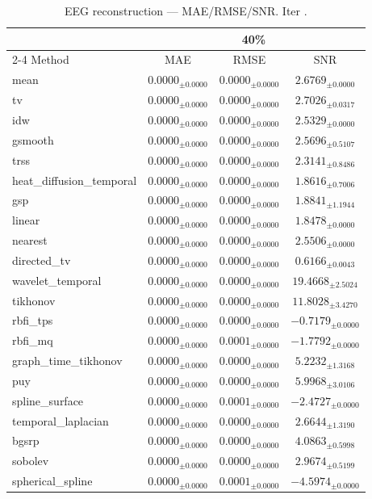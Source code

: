﻿%
\begin{table}[ht]
\centering
\caption[EEG reconstruction - Iteration it11]{EEG reconstruction — MAE/RMSE/SNR. Iter .}
\label{tab:main_it11_physionet_high_missing}
\small
\begin{tabular}{lccc}
\toprule
\multicolumn{1}{c}{} & \multicolumn{3}{c}{40\%} \\
\cmidrule(lr){2-4}
Method & MAE & RMSE & SNR \\
\midrule
mean & $0.0000_{\pm 0.0000}$ & $0.0000_{\pm 0.0000}$ & $2.6769_{\pm 0.0000}$ \\
tv & $0.0000_{\pm 0.0000}$ & $0.0000_{\pm 0.0000}$ & $2.7026_{\pm 0.0317}$ \\
idw & $0.0000_{\pm 0.0000}$ & $0.0000_{\pm 0.0000}$ & $2.5329_{\pm 0.0000}$ \\
gsmooth & $0.0000_{\pm 0.0000}$ & $0.0000_{\pm 0.0000}$ & $2.5696_{\pm 0.5107}$ \\
trss & $0.0000_{\pm 0.0000}$ & $0.0000_{\pm 0.0000}$ & $2.3141_{\pm 0.8486}$ \\
heat\_diffusion\_temporal & $0.0000_{\pm 0.0000}$ & $0.0000_{\pm 0.0000}$ & $1.8616_{\pm 0.7006}$ \\
gsp & $0.0000_{\pm 0.0000}$ & $0.0000_{\pm 0.0000}$ & $1.8841_{\pm 1.1944}$ \\
linear & $0.0000_{\pm 0.0000}$ & $0.0000_{\pm 0.0000}$ & $1.8478_{\pm 0.0000}$ \\
nearest & $0.0000_{\pm 0.0000}$ & $0.0000_{\pm 0.0000}$ & $2.5506_{\pm 0.0000}$ \\
directed\_tv & $0.0000_{\pm 0.0000}$ & $0.0000_{\pm 0.0000}$ & $0.6166_{\pm 0.0043}$ \\
wavelet\_temporal & $0.0000_{\pm 0.0000}$ & $0.0000_{\pm 0.0000}$ & $19.4668_{\pm 2.5024}$ \\
tikhonov & $0.0000_{\pm 0.0000}$ & $0.0000_{\pm 0.0000}$ & $11.8028_{\pm 3.4270}$ \\
rbfi\_tps & $0.0000_{\pm 0.0000}$ & $0.0000_{\pm 0.0000}$ & $-0.7179_{\pm 0.0000}$ \\
rbfi\_mq & $0.0000_{\pm 0.0000}$ & $0.0001_{\pm 0.0000}$ & $-1.7792_{\pm 0.0000}$ \\
graph\_time\_tikhonov & $0.0000_{\pm 0.0000}$ & $0.0000_{\pm 0.0000}$ & $5.2232_{\pm 1.3168}$ \\
puy & $0.0000_{\pm 0.0000}$ & $0.0000_{\pm 0.0000}$ & $5.9968_{\pm 3.0106}$ \\
spline\_surface & $0.0000_{\pm 0.0000}$ & $0.0001_{\pm 0.0000}$ & $-2.4727_{\pm 0.0000}$ \\
temporal\_laplacian & $0.0000_{\pm 0.0000}$ & $0.0000_{\pm 0.0000}$ & $2.6644_{\pm 1.3190}$ \\
bgsrp & $0.0000_{\pm 0.0000}$ & $0.0000_{\pm 0.0000}$ & $4.0863_{\pm 0.5998}$ \\
sobolev & $0.0000_{\pm 0.0000}$ & $0.0000_{\pm 0.0000}$ & $2.9674_{\pm 0.5199}$ \\
spherical\_spline & $0.0000_{\pm 0.0000}$ & $0.0001_{\pm 0.0000}$ & $-4.5974_{\pm 0.0000}$ \\
\bottomrule
\end{tabular}
\end{table}







